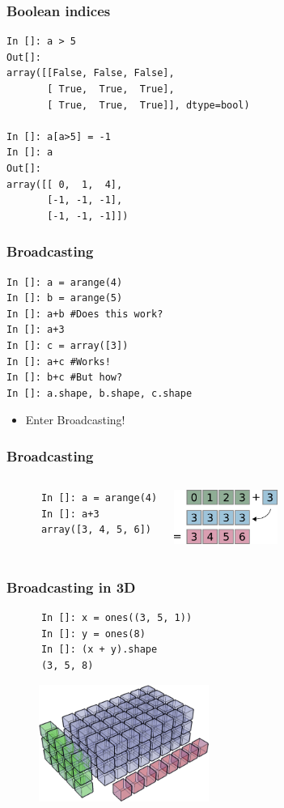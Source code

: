 \documentclass[14pt,compress]{beamer}
\begin{document}
\begin{frame}[fragile]
  \frametitle{Boolean indices}
  \begin{lstlisting}
In []: a > 5
Out[]: 
array([[False, False, False],
       [ True,  True,  True],
       [ True,  True,  True]], dtype=bool)

In []: a[a>5] = -1
In []: a
Out[]: 
array([[ 0,  1,  4],
       [-1, -1, -1],
       [-1, -1, -1]])
  \end{lstlisting}
\end{frame}


\begin{frame}[fragile]
  \frametitle{Broadcasting}
  \begin{lstlisting}
In []: a = arange(4)
In []: b = arange(5)
In []: a+b #Does this work?
In []: a+3
In []: c = array([3])
In []: a+c #Works!
In []: b+c #But how?
In []: a.shape, b.shape, c.shape
  \end{lstlisting}
  \begin{itemize}
    \item Enter Broadcasting!
  \end{itemize}
\end{frame}

\begin{frame}[fragile]
  \frametitle{Broadcasting}
  \begin{columns}
    \hspace*{-1.5in}
    \begin{lstlisting}
      In []: a = arange(4)
      In []: a+3
      array([3, 4, 5, 6])
    \end{lstlisting}
    \includegraphics[height=0.7in, interpolate=true]{data/broadcast_scalar}
  \end{columns}
\end{frame}

\begin{frame}[fragile]
  \frametitle{Broadcasting in 3D}
    \begin{lstlisting}
      In []: x = ones((3, 5, 1))
      In []: y = ones(8)
      In []: (x + y).shape
      (3, 5, 8)
    \end{lstlisting}
    \begin{figure}
      \begin{center}
      \includegraphics[height=1.5in, interpolate=true]{data/array_3x5x8}        
      \end{center}
    \end{figure}
\end{frame}
\end{document}
